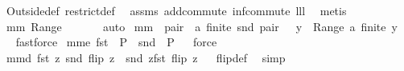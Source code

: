 \begin{isabellebody}
%
\isadelimproof
%
\endisadelimproof
%
\isatagproof
{}\isamarkupfalse%
\ Outside{\isacharunderscore}def\ restrict{\isacharunderscore}def\ \isamarkupfalse%
\ assms\ add{\isachardot}commute\ inf{\isacharunderscore}commute\ lll{}{}\ \isamarkupfalse%
\ {\isacharparenleft}metis{\isacharparenright}%
\endisatagproof
{\isafoldproof}%
%
\isadelimproof
\isanewline
%
\endisadelimproof
\isanewline
{}\isamarkupfalse%
\ mm{}{}{\isacharcolon}\ {\isachardoublequoteopen}Range\ {\isacharminus}{\isacharbackquote}\ {\isacharbraceleft}{\isacharbraceleft}{\isacharbraceright}{\isacharbraceright}\ {\isacharequal}\ {\isacharbraceleft}{\isacharbraceleft}{\isacharbraceright}{\isacharbraceright}{\isachardoublequoteclose}%
\isadelimproof
\ %
\endisadelimproof
%
\isatagproof
{}\isamarkupfalse%
\ auto%
\endisatagproof
{\isafoldproof}%
%
\isadelimproof
%
\endisadelimproof
\isanewline
\isanewline
{}\isamarkupfalse%
\ mm{}{}{\isacharcolon}\ {\isachardoublequoteopen}{\isacharparenleft}{\isasymforall}\ pair\ {\isasymin}\ a{\isachardot}\ finite\ {\isacharparenleft}snd\ pair{\isacharparenright}{\isacharparenright}\ {\isacharequal}\ {\isacharparenleft}{\isasymforall}\ y\ {\isasymin}\ Range\ a{\isachardot}\ finite\ y{\isacharparenright}{\isachardoublequoteclose}%
\isadelimproof
\ %
\endisadelimproof
%
\isatagproof
{}\isamarkupfalse%
\ fastforce%
\endisatagproof
{\isafoldproof}%
%
\isadelimproof
%
\endisadelimproof
\isanewline
\isanewline
{}\isamarkupfalse%
\ mm{}{}e{\isacharcolon}\ {\isachardoublequoteopen}fst\ {\isacharbackquote}\ P\ {\isacharequal}\ snd\ {\isacharbackquote}\ {\isacharparenleft}P{\isacharcircum}{\isacharminus}{}{\isacharparenright}{\isachardoublequoteclose}%
\isadelimproof
\ %
\endisadelimproof
%
\isatagproof
{}\isamarkupfalse%
\ force%
\endisatagproof
{\isafoldproof}%
%
\isadelimproof
%
\endisadelimproof
\isanewline
{}\isamarkupfalse%
\ mm{}{}d{\isacharcolon}\ {\isachardoublequoteopen}fst\ z\ {\isacharequal}snd\ {\isacharparenleft}flip\ z{\isacharparenright}\ {\isacharampersand}\ snd\ z{\isacharequal}fst\ {\isacharparenleft}flip\ z{\isacharparenright}{\isachardoublequoteclose}%
\isadelimproof
\ %
\endisadelimproof
%
\isatagproof
{}\isamarkupfalse%
\ flip{\isacharunderscore}def\ \isamarkupfalse%
\ simp%
\endisatagproof
{\isafoldproof}%
%
\isadelimproof
%
\endisadelimproof

\end{isabellebody}
